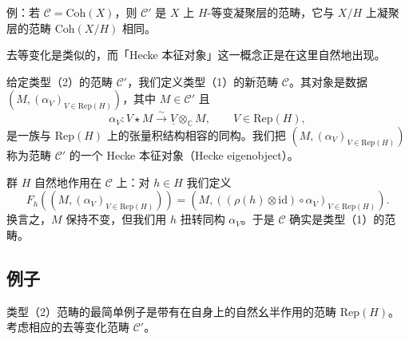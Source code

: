 例：若 $\mathcal{C} = \mathrm{Coh}(X)$，则 $\mathcal{C}'$ 是 $X$ 上 $H$-等变凝聚层的范畴，它与 $X/H$ 上凝聚层的范畴 $\mathrm{Coh}(X/H)$ 相同。

去等变化是类似的，而「Hecke 本征对象」这一概念正是在这里自然地出现。

给定类型（2）的范畴 $\mathcal{C}'$，我们定义类型（1）的新范畴 $\mathcal{C}$。其对象是数据 $(M,(\alpha_V)_{V\in\mathrm{Rep}(H)})$，其中 $M\in\mathcal{C}'$ 且
\begin{equation}\tag{6.1}
\alpha_V : V\star M\xrightarrow{\sim}\underline{V}\otimes_{\mathbb{C}} M,\qquad V\in\mathrm{Rep}(H),
\end{equation}
是一族与 $\mathrm{Rep}(H)$ 上的张量积结构相容的同构。我们把 $(M,(\alpha_V)_{V\in\mathrm{Rep}(H)})$ 称为范畴 $\mathcal{C}'$ 的一个 Hecke 本征对象（Hecke eigenobject）。


群 $H$ 自然地作用在 $\mathcal{C}$ 上：对 $h\in H$ 我们定义
\begin{equation}\tag{6.2}
F_h((M,(\alpha_V)_{V\in\mathrm{Rep}(H)})) = (M,((\rho(h)\otimes\mathrm{id})\circ\alpha_V)_{V\in\mathrm{Rep}(H)}).
\end{equation}
换言之，$M$ 保持不变，但我们用 $h$ 扭转同构 $\alpha_V$。于是 $\mathcal{C}$ 确实是类型（1）的范畴。

\subsection{例子}

类型（2）范畴的最简单例子是带有在自身上的自然幺半作用的范畴 $\mathrm{Rep}(H)$。考虑相应的去等变化范畴 $\mathcal{C}'$。


